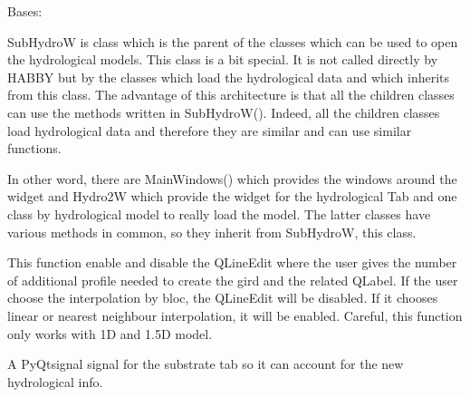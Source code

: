 \documentclass[letterpaper,10pt,english]{sphinxmanual}
\begin{document}
\begin{fulllineitems}
\label{\detokenize{index:src_GUI.hydro_GUI_2.SubHydroW}}
Bases: 

SubHydroW is class which is the parent of the classes which can be used to open the hydrological models. This class
is a bit special. It is not called directly by HABBY but by the classes which load the hydrological data and which
inherits from this class. The advantage of this architecture is that all the children classes can use the methods
written in SubHydroW(). Indeed, all the children classes load hydrological data and therefore they are similar and can use
similar functions.

In other word, there are MainWindows() which provides the windows around the widget and Hydro2W which provide the widget for the
hydrological Tab and one class by hydrological model to really load the model. The latter classes have various
methods in common, so they inherit from SubHydroW, this class.

\begin{fulllineitems}
\label{\detokenize{index:src_GUI.hydro_GUI_2.SubHydroW.dis_enable_nb_profile}}
This function enable and disable the QLineEdit where the user gives the number of additional profile needed to
create the gird and the related QLabel. If the user choose the interpolation by bloc, the QLineEdit will be
disabled. If it chooses linear or nearest neighbour interpolation, it will be enabled. Careful, this function
only works with 1D and 1.5D model.

\end{fulllineitems}


\begin{fulllineitems}
\label{\detokenize{index:src_GUI.hydro_GUI_2.SubHydroW.drop_hydro}}
A PyQtsignal signal for the substrate tab so it can account for the new hydrological info.

\end{fulllineitems}



\end{fulllineitems}
\end{document}
